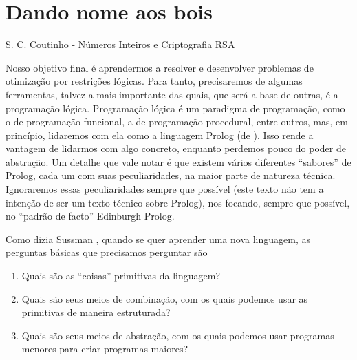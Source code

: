 
\setcounter{section}{-1}
%


%

\section{Dando nome aos bois}

\epigraph{}{S. C. Coutinho - Números Inteiros e Criptografia RSA}


Nosso objetivo final é aprendermos a resolver e desenvolver problemas de otimização por restrições lógicas.
Para tanto, precisaremos de algumas ferramentas, talvez a mais importante das quais, que
será a base de outras, é a programação lógica. Programação lógica é um paradigma de programação, como o de
programação funcional, a de programação procedural, entre outros, mas,
em princípio, lidaremos com ela como a linguagem Prolog (de
). Isso rende a vantagem de
lidarmos com algo concreto, enquanto perdemos pouco do poder de
abstração. Um detalhe que vale notar
é que existem vários diferentes ``sabores'' de Prolog, cada um com suas peculiaridades, na maior parte de natureza técnica.
Ignoraremos essas peculiaridades sempre que possível (este texto não tem a intenção de ser um texto técnico sobre Prolog), nos focando,
sempre que possível, no ``padrão de facto'' Edinburgh Prolog.

Como dizia Sussman \cite{sussman}
, quando se quer aprender uma nova linguagem, as perguntas básicas que precisamos perguntar são

\begin{enumerate}
  \item Quais são as ``coisas'' primitivas da linguagem?
  \item Quais são seus meios de combinação, com os quais podemos usar as primitivas de maneira estruturada?
  \item Quais são seus meios de abstração, com os quais podemos usar programas menores para criar programas maiores?
\end{enumerate}

